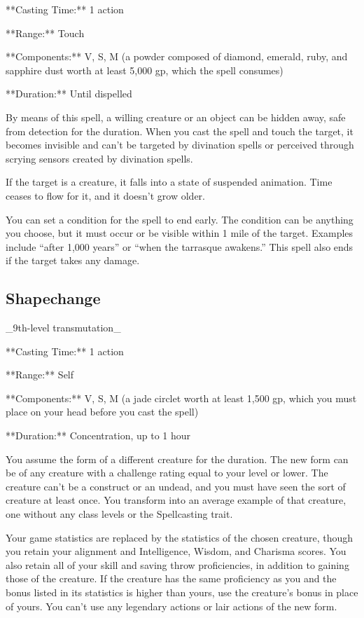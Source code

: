 **Casting Time:** 1 action

**Range:** Touch

**Components:** V, S, M (a powder composed of diamond, emerald, ruby, and sapphire dust worth at least 5,000 gp, which the spell consumes)

**Duration:** Until dispelled

By means of this spell, a willing creature or an object can be hidden away, safe from detection for the duration. When you cast the spell and touch the target, it becomes invisible and can’t be targeted by divination spells or perceived through scrying sensors created by divination spells.

If the target is a creature, it falls into a state of suspended animation. Time ceases to flow for it, and it doesn’t grow older.

You can set a condition for the spell to end early. The condition can be anything you choose, but it must occur or be visible within 1 mile of the target. Examples include “after 1,000 years” or “when the tarrasque awakens.” This spell also ends if the target takes any damage.

\subsection{Shapechange}

_9th-level transmutation_

**Casting Time:** 1 action

**Range:** Self

**Components:** V, S, M (a jade circlet worth at least 1,500 gp, which you must place on your head before you cast the spell)

**Duration:** Concentration, up to 1 hour

You assume the form of a different creature for the duration. The new form can be of any creature with a challenge rating equal to your level or lower. The creature can’t be a construct or an undead, and you must have seen the sort of creature at least once. You transform into an average example of that creature, one without any class levels or the Spellcasting trait.

Your game statistics are replaced by the statistics of the chosen creature, though you retain your alignment and Intelligence, Wisdom, and Charisma scores. You also retain all of your skill and saving throw proficiencies, in addition to gaining those of the creature. If the creature has the same proficiency as you and the bonus listed in its statistics is higher than yours, use the creature’s bonus in place of yours. You can’t use any legendary actions or lair actions of the new form.


